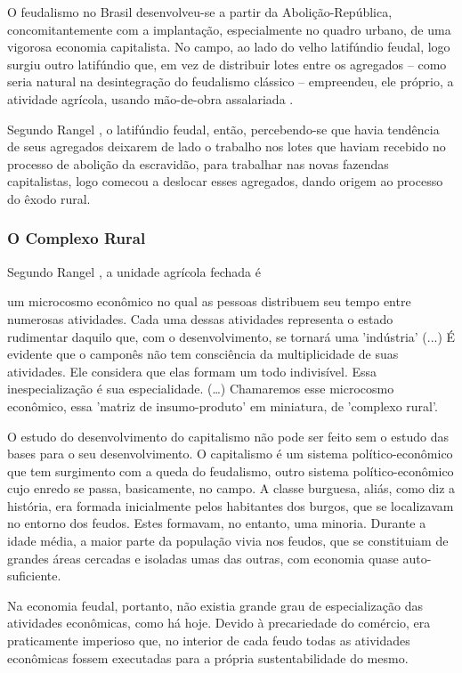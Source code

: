 \documentclass[
	12pt,				%
	oneside,			%
	a4paper,			%
	chapter=TITLE,		%
	section=TITLE,		%
	english,			%
	brazil				%
	]{abntex2}
\begin{document}
O feudalismo no Brasil desenvolveu-se a partir da Abolição-República,
concomitantemente com a implantação, especialmente no quadro urbano, de uma
vigorosa economia capitalista. No campo, ao lado do velho latifúndio feudal,
logo surgiu outro latifúndio que, em vez de distribuir lotes entre os agregados
-- como seria natural na desintegração do feudalismo clássico -- empreendeu, ele
próprio, a atividade agrícola, usando mão-de-obra assalariada \autocite[
738-739]{rangel1989}.

Segundo Rangel \autocite*[739]{rangel1989}, o latifúndio feudal, então, percebendo-se
que havia tendência de seus agregados deixarem de lado o trabalho nos lotes
que haviam recebido no processo de abolição da escravidão, para trabalhar nas
novas fazendas capitalistas, logo comecou a deslocar esses agregados, dando
origem ao processo do êxodo rural.

\hypertarget{o-complexo-rural}{%
\subsubsection{O Complexo Rural}\label{o-complexo-rural}}

Segundo Rangel \autocite*[p.98]{rangel1956}, a unidade agrícola fechada é
\begin{citacao}
um microcosmo econômico no qual as pessoas distribuem seu tempo entre numerosas
atividades. Cada uma dessas atividades representa o estado rudimentar daquilo
que, com o desenvolvimento, se tornará uma 'indústria' (...) É evidente que o
camponês não tem consciência da multiplicidade de suas atividades. Ele considera
que elas formam um todo indivisível. Essa inespecialização é sua especialidade.
(\ldots) Chamaremos esse microcosmo econômico, essa 'matriz de insumo-produto' em
miniatura, de 'complexo rural'.
\end{citacao}
O estudo do desenvolvimento do capitalismo não pode ser feito sem o estudo das
bases para o seu desenvolvimento. O capitalismo é um sistema político-econômico
que tem surgimento com a queda do feudalismo, outro sistema político-econômico
cujo enredo se passa, basicamente, no campo. A classe burguesa, aliás, como diz
a história, era formada inicialmente pelos habitantes dos burgos, que se
localizavam no entorno dos feudos. Estes formavam, no entanto, uma minoria.
Durante a idade média, a maior parte da população vivia nos feudos, que se
constituiam de grandes áreas cercadas e isoladas umas das outras, com economia
quase auto-suficiente.

Na economia feudal, portanto, não existia grande grau de especialização das
atividades econômicas, como há hoje. Devido à precariedade do comércio, era
praticamente imperioso que, no interior de cada feudo todas as atividades
econômicas fossem executadas para a própria sustentabilidade do mesmo.
\end{document}
